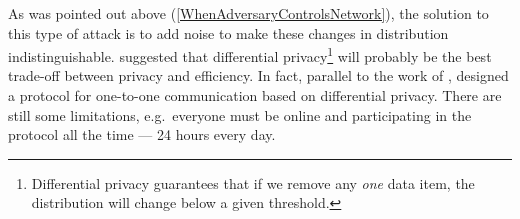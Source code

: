 As was pointed out above (\cref{WhenAdversaryControlsNetwork}), the solution to 
this type of attack is to add noise to make these changes in distribution 
indistinguishable.
\citeauthor{PPACinPubFS} suggested that differential privacy\footnote{%
  Differential privacy guarantees that if we remove any \emph{one} data item, 
  the distribution will change below a given threshold.
} will probably be the best trade-off between privacy and efficiency.
In fact, parallel to the work of \citeauthor{PPACinPubFS}, 
\textcite{Vuvuzela,Alpenhorn} designed a protocol for one-to-one communication 
based on differential privacy.
There are still some limitations, e.g.\ everyone must be online and 
participating in the protocol all the time --- 24 hours every day.

%
